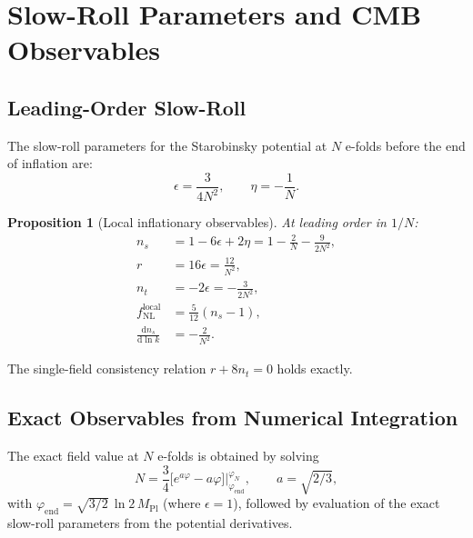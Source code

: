 \documentclass[11pt,a4paper]{article}
\renewcommand{\dd}{\mathrm{d}}
\theoremstyle{plain}
\newtheorem{proposition}[theorem]{Proposition}
\theoremstyle{definition}
\begin{document}
\section{Slow-Roll Parameters and CMB Observables}\label{sec:slow-roll}

\subsection{Leading-Order Slow-Roll}

The slow-roll parameters for the Starobinsky potential at $N$ e-folds
before the end of inflation are:
\begin{equation}\label{eq:slow-roll-leading}
  \epsilon = \frac{3}{4N^2}, \qquad
  \eta = -\frac{1}{N}.
\end{equation}

\begin{proposition}[Local inflationary observables]\label{prop:observables}
At leading order in $1/N$:
\begin{align}
  n_s &= 1 - 6\epsilon + 2\eta = 1 - \frac{2}{N} - \frac{9}{2N^2},
  \label{eq:ns}\\
  r &= 16\epsilon = \frac{12}{N^2},
  \label{eq:r}\\
  n_t &= -2\epsilon = -\frac{3}{2N^2},
  \label{eq:nt}\\
  f_{\mathrm{NL}}^{\mathrm{local}} &= \frac{5}{12}(n_s - 1),
  \label{eq:fNL}\\
  \frac{\dd n_s}{\dd \ln k} &= -\frac{2}{N^2}.
  \label{eq:running}
\end{align}
\end{proposition}

The single-field consistency relation $r + 8n_t = 0$ holds exactly.

\subsection{Exact Observables from Numerical Integration}

The exact field value at $N$ e-folds is obtained by solving
\begin{equation}\label{eq:efold-integral}
  N = \frac{3}{4}\bigl[e^{a\varphi} - a\varphi\bigr]
  \bigg|_{\varphi_{\mathrm{end}}}^{\varphi_N},
  \qquad a = \sqrt{2/3},
\end{equation}
with $\varphi_{\mathrm{end}} = \sqrt{3/2}\,\ln 2\,M_{\mathrm{Pl}}$
(where $\epsilon = 1$), followed by evaluation of the exact slow-roll
parameters from the potential derivatives.
\end{document}
